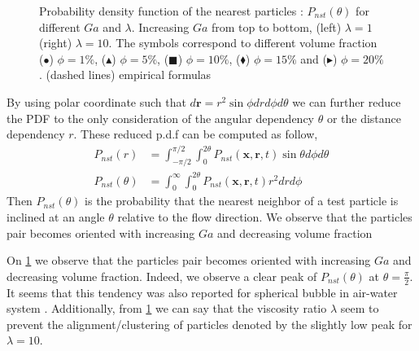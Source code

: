 \begin{figure}
\begin{tikzpicture}
    \end{tikzpicture}
    \caption{Probability density function of the nearest particles : $P_{nst}(\theta)$ for different $Ga$ and $\lambda$. 
    Increasing $Ga$ from top to bottom, (left) $\lambda = 1$ (right) $\lambda = 10$. 
    The symbols correspond to different volume fraction ($\bullet$) $\phi = 1\%$, ($\blacktriangle$) $\phi = 5\%$, ($\blacksquare$) $\phi = 10\%$, ($\blacklozenge$) $\phi = 15\%$ and ($\blacktriangleright$) $\phi = 20\%$.
    (dashed lines) empirical formulas }
    \label{fig:P_nst_theta}
\end{figure}
By using polar coordinate such that $d \textbf{r} = r^2 \sin \phi dr d\phi d\theta$ we can further reduce the PDF to the only consideration of the angular dependency $\theta$ or the distance dependency $r$. 
These reduced p.d.f can be computed as follow, 
\begin{align*}
    P_{nst}(r) 
    &= \int_{-\pi/2}^{\pi/2}\int_{0}^{2\theta} P_{nst}(\textbf{x},\textbf{r},t) \sin \theta  d\phi d\theta\\
    P_{nst}(\theta)
    &= \int_{0}^{\infty}\int_{0}^{2\theta} P_{nst}(\textbf{x},\textbf{r},t) r^2  dr d\phi
\end{align*}
Then $P_{nst}(\theta)$ is the probability that the nearest neighbor of a test particle is inclined at an angle $\theta$ relative to the flow direction. 
We observe that the particles pair becomes oriented with increasing $Ga$ and decreasing volume fraction

On \ref{fig:P_nst_theta} we observe that the particles pair becomes oriented with increasing $Ga$ and decreasing volume fraction.
Indeed, we observe a clear peak of $P_{nst}(\theta)$ at $\theta = \frac{\pi}{2}$. 
It seems that this tendency was also reported for spherical bubble in air-water system \citet{bunner2003effect}. 
Additionally, from \ref{fig:P_nst_theta} we can say that the viscosity ratio $\lambda$ seem to prevent the alignment/clustering of particles denoted by the slightly low peak for $\lambda =10$. 


